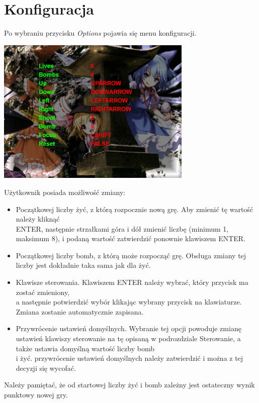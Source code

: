	\section{Konfiguracja}
		Po wybraniu przycisku \emph{Options} pojawia się menu konfiguracji.
		\begin{center}
			\includegraphics[width=0.7\textwidth]{./images/options_clear}
		\end{center}
		Użytkownik posiada możliwość zmiany:
		\begin{itemize}
			\item Początkowej liczby żyć, z którą rozpocznie nową grę. Aby zmienić tę wartość należy kliknąć\\ENTER, następnie strzałkami góra i dół zmienić liczbę (minimum 1, maksimum 8), i podaną wartość zatwierdzić ponownie klawiszem ENTER.
			\item Początkowej liczby bomb, z którą może rozpocząć grę. Obsługa zmiany tej liczby jest dokładnie taka sama jak dla żyć. 
			\item Klawisze sterowania. Klawiszem ENTER należy wybrać, który przycisk ma zostać zmieniony,\\a następnie potwierdzić wybór klikając wybrany przycisk na klawiaturze. Zmiana zostanie automatycznie zapisana.
			\item Przywrócenie ustawień domyślnych. Wybranie tej opcji powoduje zmianę ustawień klawiszy sterowanie na tę opisaną w podrozdziale Sterowanie, a także ustawia domyślną wartość liczby bomb\\i żyć. przywrócenie ustawień domyślnych należy zatwierdzić i można z tej decyzji się wycofać.
		\end{itemize}
		Należy pamiętać, że od startowej liczby żyć i bomb zależny jest ostateczny wynik punktowy nowej gry.
	\newpage
